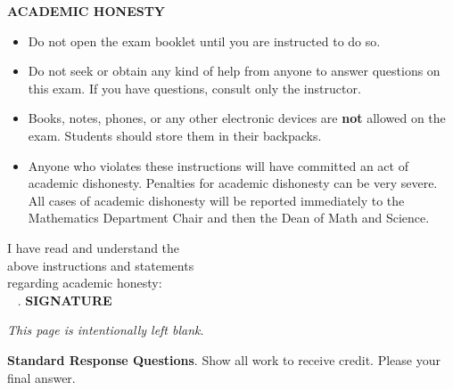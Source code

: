 \documentclass[addpoints,18pt,answers]{exam}
\begin{document}
\textbf{ACADEMIC HONESTY}\\[8pt]
\phantom{.}\hspace{.7cm}
\begin{minipage}{6.3in}
	\begin{itemize}
		
		\item Do not open the exam booklet until you are instructed to do so.
		\item Do not seek or obtain any kind of help from anyone to answer questions on this exam. If you have questions, consult only the instructor.
		\item Books, notes, phones, or any other electronic devices are \textbf{not} allowed on the exam. Students should store them in their backpacks.
		\item Anyone who violates these instructions will have committed an act of academic dishonesty.
		Penalties for academic dishonesty can be very severe. All cases of academic dishonesty will be reported immediately to the Mathematics Department Chair and then the Dean of Math and Science.
	\end{itemize}
\end{minipage}

\vspace{1cm}

\noindent I have read and understand the\\ above instructions and statements\\ regarding academic honesty:  \, \, \hrulefill\\
\ {\color{white} .} \hspace{11 cm} \textbf{{\footnotesize SIGNATURE}}


\vfill
\changefontsize{18pt}

\newpage
\phantom{.}
\vfill
\begin{center}
   \textit{This page is intentionally left blank}.
\end{center}
\vfill

\newpage

\changefontsize{18pt}

\begin{tcolorbox}[colback=gray!15,colframe=black]
		{\textbf{Standard Response Questions}. Show all work to receive credit. Please  your final answer. }
\end{tcolorbox}
\end{document}
